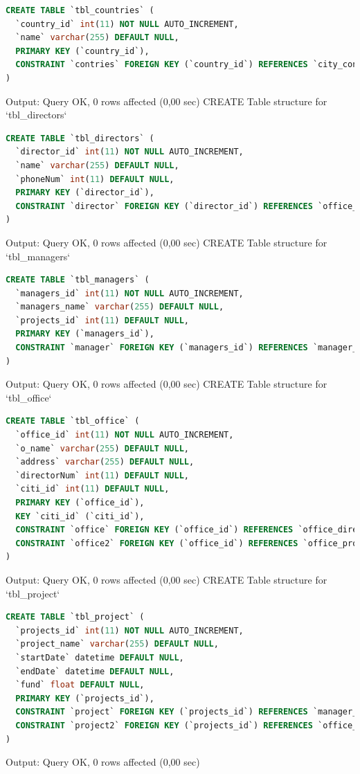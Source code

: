\documentclass[12pt]{report}
\begin{document}
\begin{lstlisting}[language=sql]
CREATE TABLE `tbl_countries` (
  `country_id` int(11) NOT NULL AUTO_INCREMENT,
  `name` varchar(255) DEFAULT NULL,
  PRIMARY KEY (`country_id`),
  CONSTRAINT `contries` FOREIGN KEY (`country_id`) REFERENCES `city_contries` (`countries_id`) ON DELETE CASCADE ON UPDATE CASCADE
)
\end{lstlisting}
Output: Query OK, 0 rows affected (0,00 sec)
CREATE Table structure for `tbl\_directors`

\begin{lstlisting}[language=sql]
CREATE TABLE `tbl_directors` (
  `director_id` int(11) NOT NULL AUTO_INCREMENT,
  `name` varchar(255) DEFAULT NULL,
  `phoneNum` int(11) DEFAULT NULL,
  PRIMARY KEY (`director_id`),
  CONSTRAINT `director` FOREIGN KEY (`director_id`) REFERENCES `office_director` (`director_id`) ON DELETE CASCADE ON UPDATE CASCADE
)
\end{lstlisting}
Output: Query OK, 0 rows affected (0,00 sec)
CREATE Table structure for `tbl\_managers`

\begin{lstlisting}[language=sql]
CREATE TABLE `tbl_managers` (
  `managers_id` int(11) NOT NULL AUTO_INCREMENT,
  `managers_name` varchar(255) DEFAULT NULL,
  `projects_id` int(11) DEFAULT NULL,
  PRIMARY KEY (`managers_id`),
  CONSTRAINT `manager` FOREIGN KEY (`managers_id`) REFERENCES `manager_project` (`manager_id`) ON DELETE CASCADE ON UPDATE CASCADE
)
\end{lstlisting}
Output: Query OK, 0 rows affected (0,00 sec)
CREATE Table structure for `tbl\_office`

\begin{lstlisting}[language=sql]
CREATE TABLE `tbl_office` (
  `office_id` int(11) NOT NULL AUTO_INCREMENT,
  `o_name` varchar(255) DEFAULT NULL,
  `address` varchar(255) DEFAULT NULL,
  `directorNum` int(11) DEFAULT NULL,
  `citi_id` int(11) DEFAULT NULL,
  PRIMARY KEY (`office_id`),
  KEY `citi_id` (`citi_id`),
  CONSTRAINT `office` FOREIGN KEY (`office_id`) REFERENCES `office_director` (`office_id`) ON DELETE CASCADE ON UPDATE CASCADE,
  CONSTRAINT `office2` FOREIGN KEY (`office_id`) REFERENCES `office_project` (`office_id`) ON DELETE CASCADE ON UPDATE CASCADE
)
\end{lstlisting}
Output: Query OK, 0 rows affected (0,00 sec)
CREATE Table structure for `tbl\_project`

\begin{lstlisting}[language=sql]
CREATE TABLE `tbl_project` (
  `projects_id` int(11) NOT NULL AUTO_INCREMENT,
  `project_name` varchar(255) DEFAULT NULL,
  `startDate` datetime DEFAULT NULL,
  `endDate` datetime DEFAULT NULL,
  `fund` float DEFAULT NULL,
  PRIMARY KEY (`projects_id`),
  CONSTRAINT `project` FOREIGN KEY (`projects_id`) REFERENCES `manager_project` (`project_id`) ON DELETE CASCADE ON UPDATE CASCADE,
  CONSTRAINT `project2` FOREIGN KEY (`projects_id`) REFERENCES `office_project` (`project_id`) ON DELETE CASCADE ON UPDATE CASCADE
)
\end{lstlisting}
Output: Query OK, 0 rows affected (0,00 sec)
\end{document}

